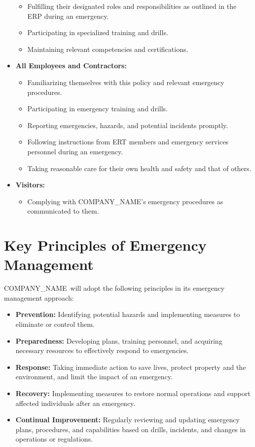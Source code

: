 \documentclass[11pt]{article}
\newcommand{\clientName}{{{COMPANY_NAME}}}
\begin{document}
\begin{itemize}
\begin{itemize}
        \item Fulfilling their designated roles and responsibilities as outlined in the ERP during an emergency.
        \item Participating in specialized training and drills.
        \item Maintaining relevant competencies and certifications.
    \end{itemize}
    \item \textbf{All Employees and Contractors:}
    \begin{itemize}
        \item Familiarizing themselves with this policy and relevant emergency procedures.
        \item Participating in emergency training and drills.
        \item Reporting emergencies, hazards, and potential incidents promptly.
        \item Following instructions from ERT members and emergency services personnel during an emergency.
        \item Taking reasonable care for their own health and safety and that of others.
    \end{itemize}
    \item \textbf{Visitors:}
    \begin{itemize}
        \item Complying with \clientName's emergency procedures as communicated to them.
    \end{itemize}
\end{itemize}

\section{Key Principles of Emergency Management}
\clientName\ will adopt the following principles in its emergency management approach:
\begin{itemize}
    \item \textbf{Prevention:} Identifying potential hazards and implementing measures to eliminate or control them.
    \item \textbf{Preparedness:} Developing plans, training personnel, and acquiring necessary resources to effectively respond to emergencies.
    \item \textbf{Response:} Taking immediate action to save lives, protect property and the environment, and limit the impact of an emergency.
    \item \textbf{Recovery:} Implementing measures to restore normal operations and support affected individuals after an emergency.
    \item \textbf{Continual Improvement:} Regularly reviewing and updating emergency plans, procedures, and capabilities based on drills, incidents, and changes in operations or regulations.
\end{itemize}
\end{document}
